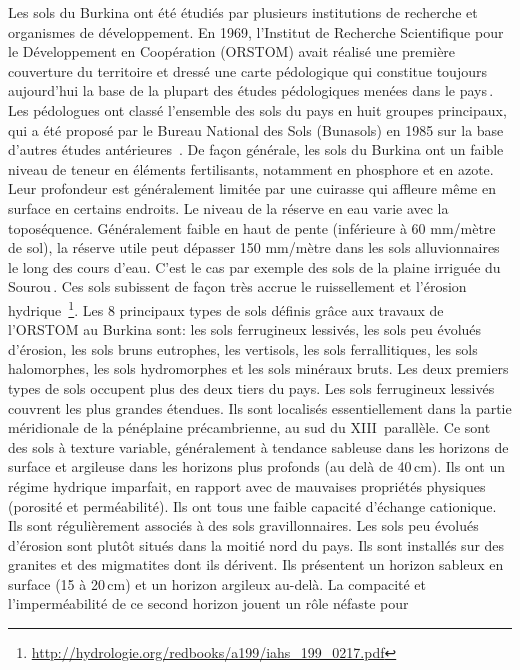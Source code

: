 \documentclass[a4paper,11pt]{article}
\begin{document}
Les sols du Burkina ont été étudiés par plusieurs institutions de
recherche et organismes de développement. En 1969, l'Institut de
Recherche Scientifique pour le Développement en Coopération (ORSTOM)
avait réalisé une première couverture du territoire et dressé une
carte pédologique qui constitue toujours aujourd'hui la base de la
plupart des études pédologiques menées dans le pays\,\cite{BUNASOLS_2004}.
Les pédologues ont classé l'ensemble des sols du pays
en huit groupes principaux, qui a été proposé par le Bureau National
des Sols (Bunasols) en 1985 sur la base d'autres études antérieures
\,\cite{PERON_1975}. De façon générale, les sols du Burkina ont un
faible niveau de teneur en éléments fertilisants, notamment en
phosphore et en azote. Leur profondeur est généralement limitée par une
cuirasse qui affleure même en surface en certains endroits. Le niveau
de la réserve en eau varie avec la toposéquence. Généralement faible
en haut de pente (inférieure à 60 mm/mètre de sol), la réserve utile
peut dépasser 150 mm/mètre dans les sols alluvionnaires le long des
cours d'eau. C'est le cas par exemple des sols de la plaine irriguée
du Sourou\,\cite{SOMENICOU_1983}. Ces sols subissent de façon très accrue
le ruissellement et l'érosion hydrique\,\cite{Roose_2004}
\footnote{\url{http://hydrologie.org/redbooks/a199/iahs_199_0217.pdf}}. Les
8 principaux types de sols définis grâce aux travaux de l'ORSTOM au
Burkina sont: les sols ferrugineux lessivés, les sols peu évolués
d’érosion, les sols bruns eutrophes, les vertisols, les sols
ferrallitiques, les sols halomorphes, les sols hydromorphes et les
sols minéraux bruts. Les deux premiers types de sols occupent plus des
deux tiers du pays. Les sols ferrugineux lessivés couvrent les plus
grandes étendues. Ils sont localisés essentiellement dans la partie
méridionale de la pénéplaine précambrienne, au sud du XIII\ieme\,
parallèle. Ce sont des sols à texture variable, généralement à
tendance sableuse dans les horizons de surface et argileuse dans les
horizons plus profonds (au delà de 40\,cm). Ils ont un régime hydrique
imparfait, en rapport avec de mauvaises propriétés physiques (porosité
et perméabilité). Ils ont tous une faible capacité d’échange
cationique. Ils sont régulièrement associés à des sols
gravillonnaires. Les sols peu évolués d’érosion sont plutôt situés
dans la moitié nord du pays. Ils sont installés sur des granites et
des migmatites dont ils dérivent. Ils présentent un horizon sableux en
surface (15 à 20\,cm) et un horizon argileux au-delà. La compacité et
l’imperméabilité de ce second horizon jouent un rôle néfaste pour
\end{document}

